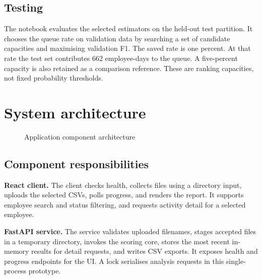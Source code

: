\subsection{Testing}
The notebook evaluates the selected estimators on the held-out test
partition. It chooses the queue rate on validation data by searching a
set of candidate capacities and maximising validation F1. The saved
rate is one percent. At that rate the test set contributes 662
employee-days to the queue. A five-percent capacity is also retained
as a comparison reference. These are ranking capacities, not fixed
probability thresholds.

\section{System architecture}
\begin{figure}[H]
\centering
{}
\caption{Application component architecture}
\label{fig:architecture}
\end{figure}

\subsection{Component responsibilities}
\textbf{React client.} The client checks health, collects files using a
directory input, uploads the selected CSVs, polls progress, and
renders the report. It supports employee search and status filtering,
and requests activity detail for a selected employee.

\textbf{FastAPI service.} The service validates uploaded filenames,
stages accepted files in a temporary directory, invokes the scoring
core, stores the most recent in-memory results for detail requests,
and writes CSV exports. It exposes health and progress endpoints for
the UI. A lock serialises analysis requests in this single-process
prototype.


